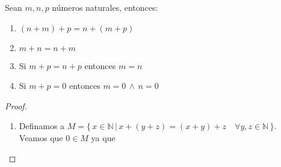     \begin{proposition} Sean $m,n,p$ números naturales, entonces:
        \begin{enumerate}
            \item $(n+m)+p = n+(m+p)$
            \item $m + n = n + m$
            \item Si $m +p = n + p$ entonces $m = n$
            \item Si $m +p = 0$ entonces $m=0 \, \land \, n=0$
        \end{enumerate}
    \end{proposition}
    \begin{proof} 
        $\quad$ \\ 
        \begin{enumerate}
            \item Definamos a $M= \{\, x \in \mathbb{N} \, | \, x + (y + z) = (x +
                y) + z \quad \forall y, z \in \mathbb{N} \, \}$. \\
                Veamos que $0 \in M$ ya que 


\end{enumerate}
\end{proof}
